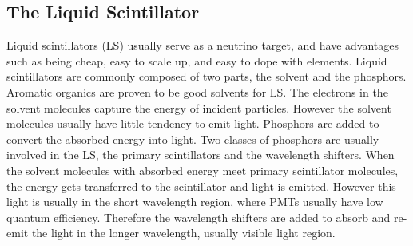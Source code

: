 \subsection{The Liquid Scintillator}
Liquid scintillators (LS) usually serve as a neutrino target, and have advantages such as being cheap, easy to scale up, and easy to dope with elements. Liquid scintillators are commonly composed of two parts, the solvent and the phosphors. Aromatic organics are proven to be good solvents for LS. The electrons in the solvent molecules capture the energy of incident particles. However the solvent molecules usually have little tendency to emit light. Phosphors are added to convert the absorbed energy into light. Two classes of phosphors are usually involved in the LS, the primary scintillators and the wavelength shifters. When the solvent molecules with absorbed energy meet primary scintillator molecules, the energy gets transferred to the scintillator and light is emitted. However this light is usually in the short wavelength region, where PMTs usually have low quantum efficiency. Therefore the wavelength shifters are added to absorb and re-emit the light in the longer wavelength, usually visible light region.

